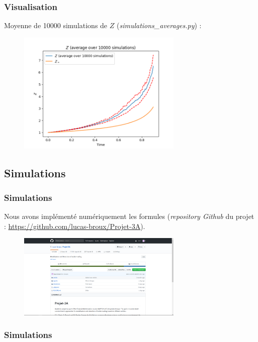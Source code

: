 \documentclass{beamer}
\begin{document}
\begin{frame}
\frametitle{Visualisation}
\par Moyenne de 10000 simulations de $Z$ (\emph{simulations\_averages.py}) : 
\begin{figure}[H]
  \centering
    \includegraphics[width=0.7\textwidth]{images/average_10000.png}
  \caption{}
\end{figure}
\end{frame}

\subsection{Simulations}

\begin{frame}
\frametitle{Simulations}
\par Nous avons implémenté numériquement les formules (\emph{repository Github} du projet : \url{https://github.com/lucas-broux/Projet-3A}).
\begin{figure}[H]
  \centering
    \includegraphics[width=0.7\textwidth]{images/github.png}
  \caption{}
\end{figure}

\end{frame}

\begin{frame}
\frametitle{Simulations}

\end{frame}
\end{document}
